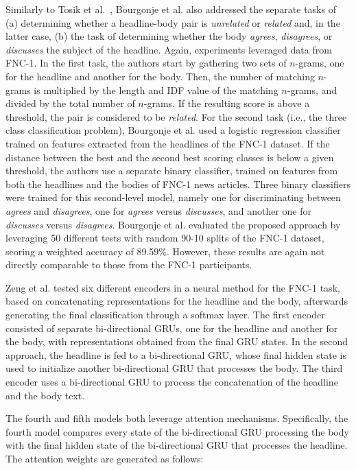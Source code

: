 Similarly to Tosik et al.~\cite{tosikdebunking}, 
Bourgonje et al. \cite{clickbait} also addressed the separate tasks of (a) determining whether a headline-body pair is \textit{unrelated} or \textit{related} and, in the latter case, (b) the task of determining whether the body \textit{agrees}, \textit{disagrees}, or \textit{discusses} the subject of the headline. Again, experiments leveraged data from FNC-1. In the first task, the authors start by gathering two sets of $n$-grams, one for the headline and another for the body. Then, the number of matching $n$-grams is multiplied by the length and IDF value of the matching $n$-grams, and divided by the total number of $n$-grams. If the resulting score is above a threshold, the pair is considered to be \textit{related}. For the second task (i.e., the three class classification problem), Bourgonje et al. used a logistic regression classifier trained on features extracted from the headlines of the FNC-1 dataset. If the distance between the best and the second best scoring classes is below a given threshold, the authors use a separate binary classifier, trained on features from both the headlines and the bodies of FNC-1 news articles. Three binary classifiers were trained for this second-level model, namely one for discriminating between \textit{agrees} and \textit{disagrees}, one for \textit{agrees} versus \textit{discusses}, and another one for \textit{discusses} versus \textit{disagrees}. Bourgonje et al. evaluated the proposed approach by leveraging 50 different tests with random 90-10 splits of the FNC-1 dataset, scoring a weighted accuracy of 89.59\%. However, these results are again not directly comparable to those from the FNC-1 participants.

Zeng et al. \cite{stanfordneural} tested six different encoders in a neural method for the FNC-1 task, based on concatenating representations for the headline and the body, afterwards generating the final classification through a softmax layer. The first encoder consisted of separate bi-directional GRUs, one for the headline and another for the body, with representations obtained from the final GRU states. In the second approach, the headline is fed to a bi-directional GRU, whose final hidden state is used to initialize another bi-directional GRU that processes the body. The third encoder uses a bi-directional GRU to process the concatenation of the headline and the body text.

The fourth and fifth models both leverage attention mechanisms. Specifically, the fourth model compares every state of the bi-directional GRU processing the body with the final hidden state of the bi-directional GRU that processes the headline. The attention weights are generated as follows:

